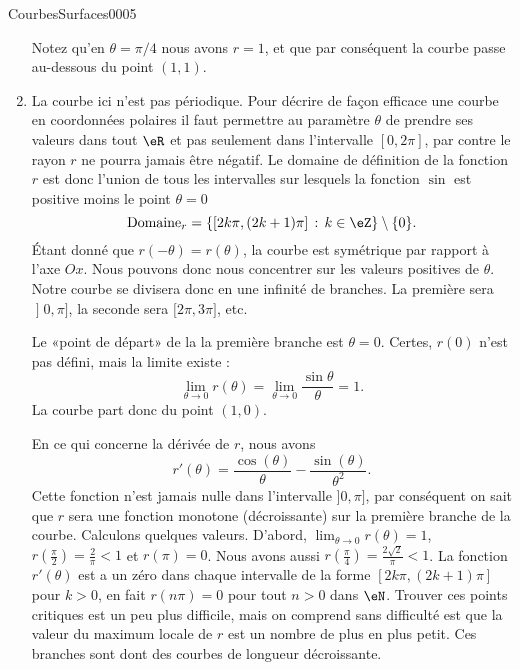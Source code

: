 \begin{corrige}{CourbesSurfaces0005}
\begin{enumerate}
			Notez qu'en $\theta=\pi/4$ nous avons $r=1$, et que par conséquent la courbe passe au-dessous du point $(1,1)$.
		\item
		  La courbe ici n'est pas périodique. Pour décrire de façon efficace une courbe en coordonnées polaires il faut permettre au paramètre $\theta$ de prendre ses valeurs dans tout $\eR$ et pas seulement dans l'intervalle $[0,2\pi]$, par contre le rayon $r$ ne pourra jamais être négatif. Le domaine de définition de la fonction $r$ est donc l'union de tous les intervalles sur lesquels la fonction $\sin$ est positive moins le point $\theta=0$
                  \begin{equation}
                    \textrm{Domaine}_r=\{[2k\pi, (2k+1)\pi]\,:\, k\in\eZ\}\setminus\{0\}.
                  \end{equation}
			Étant donné que $r(-\theta)=r(\theta)$, la courbe est symétrique par rapport à l'axe $Ox$. Nous pouvons donc nous concentrer sur les valeurs positives de $\theta$. Notre courbe se divisera donc en une infinité de branches. La première sera \( \mathopen] 0 , \pi \mathclose]\), la seconde sera \( \mathopen[ 2\pi , 3\pi \mathclose]\), etc.
            
            Le «point de départ» de la la première branche est \( \theta=0\). Certes, \( r(0)\) n'est pas défini, mais la limite existe :
            \begin{equation}
                \lim_{\theta\to 0} r(\theta)=\lim_{\theta\to 0} \frac{ \sin\theta }{ \theta }=1.
            \end{equation}
            La courbe part donc du point \( (1,0)\).

            
            
            
            En ce qui concerne la dérivée de $r$, nous avons
			\begin{equation}
				r'(\theta)=\frac{ \cos(\theta) }{ \theta }-\frac{ \sin(\theta) }{ \theta^2 }.
			\end{equation}
                        Cette fonction n'est jamais nulle dans l'intervalle $]0,\pi]$, par conséquent on sait que $r$ sera une fonction monotone (décroissante) sur la première branche de la courbe.  Calculons quelques valeurs. D'abord, $\lim_{\theta\to 0}r(\theta)=1$, $r(\frac{ \pi }{2})=\frac{ 2 }{ \pi }<1$ et $r(\pi)=0$. Nous avons aussi $r(\frac{ \pi }{ 4 })=\frac{ 2\sqrt{2} }{ \pi }<1$.
		        La fonction $r'(\theta)$ est a un zéro dans chaque intervalle de la forme $[2k\pi, (2k+1)\pi]$ pour $k>0$, en fait $r(n\pi)=0$ pour tout $n>0$ dans $\eN$. Trouver ces points critiques est un peu plus difficile, mais on comprend sans difficulté est que la valeur du maximum locale de $r$ est un nombre de plus en plus petit. Ces branches sont dont des courbes de longueur décroissante.  


\end{enumerate}
\end{corrige}
